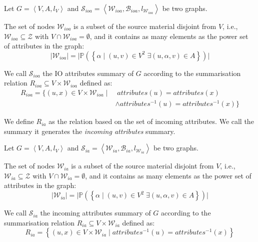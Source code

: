 \begin{definition}
	Let $G=\left\langle V, A, l_V \right\rangle$ and $\mathcal{S}_{ioa} = \left\langle \mathcal{W}_{ioa}, \mathcal{B}_{ioa}, l_{\mathcal{W}_{ioa}} \right\rangle$ be two graphs.

	The set of nodes $\mathcal{W}_{ioa}$ is a subset of the source material disjoint from $V$, i.e., $\mathcal{W}_{ioa} \subseteq \mathcal{Z}$ with $V \cap \mathcal{W}_{ioa} = \emptyset$, and it contains as many elements as the power set of attributes in the graph:
	$$
	\lvert \mathcal{W}_{ioa} \rvert = \lvert \mathbb{P}\left( \left\lbrace \alpha \mid (u, v) \in V^2\; \exists (u, \alpha, v) \in A \right\rbrace \right) \rvert
	$$

	We call $\mathcal{S}_{ioa}$ the IO attributes summary of $G$ according to the summarisation relation $R_{ioa} \subseteq V \times \mathcal{W}_{ioa}$ defined as:
	$$
	\begin{aligned}
	R_{ioa} =
	\{
	(u, x) \in V \times \mathcal{W}_{ioa} \mid &\; attributes(u) = attributes(x) \\
	& \wedge attributes^{-1}(u) = attributes^{-1}(x)
	\}
	\end{aligned}
	$$
	\label{def:ioa}
\end{definition}

\vspace{.5cm}


We define $R_{ia}$ as the relation based on the set of incoming attributes. We call the summary it generates the \emph{incoming attributes} summary.

\begin{definition}
	Let $G=\left\langle V, A, l_V \right\rangle$ and $\mathcal{S}_{ia} = \left\langle \mathcal{W}_{ia}, \mathcal{B}_{ia}, l_{\mathcal{W}_{ia}} \right\rangle$ be two graphs.

	The set of nodes $\mathcal{W}_{ia}$ is a subset of the source material disjoint from $V$, i.e., $\mathcal{W}_{ia} \subseteq \mathcal{Z}$ with $V \cap \mathcal{W}_{ia} = \emptyset$, and it contains as many elements as the power set of attributes in the graph:
	$$
	\lvert \mathcal{W}_{ia} \rvert = \lvert \mathbb{P}\left( \left\lbrace \alpha \mid (u, v) \in V^2\; \exists (u, \alpha, v) \in A \right\rbrace \right) \rvert
	$$

	We call $\mathcal{S}_{ia}$ the incoming attributes summary of $G$ according to the summarisation relation $R_{ia} \subseteq V \times \mathcal{W}_{ia}$ defined as:
	$$
	R_{ia} = \left\lbrace (u, x) \in V \times \mathcal{W}_{ia} \mid attributes^{-1}(u) = attributes^{-1}(x) \right\rbrace
	$$
	\label{def:ia}
\end{definition}

